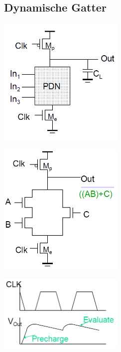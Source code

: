 	\subsection{Dynamische Gatter}
		\begin{multicols}{3}
			\includegraphics[width=6cm]{bilder/cmosDynPrinzip.png}\\
			\columnbreak
			
			\includegraphics[width=6cm]{bilder/cmosDynSchema.png}\\
			\columnbreak
			
			\includegraphics[width=6cm]{bilder/cmosDynSignal.png}
			\columnbreak
			
		\end{multicols}	
	